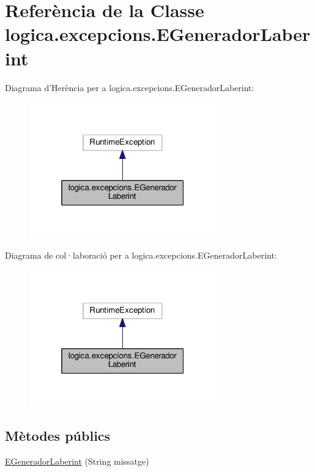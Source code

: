\hypertarget{classlogica_1_1excepcions_1_1_e_generador_laberint}{\section{Referència de la Classe logica.\+excepcions.\+E\+Generador\+Laberint}
\label{classlogica_1_1excepcions_1_1_e_generador_laberint}
}


Diagrama d'Herència per a logica.\+excepcions.\+E\+Generador\+Laberint\+:
\nopagebreak
\begin{figure}[H]
\begin{center}
\leavevmode
\includegraphics[width=229pt]{classlogica_1_1excepcions_1_1_e_generador_laberint__inherit__graph}
\end{center}
\end{figure}


Diagrama de col·laboració per a logica.\+excepcions.\+E\+Generador\+Laberint\+:
\nopagebreak
\begin{figure}[H]
\begin{center}
\leavevmode
\includegraphics[width=229pt]{classlogica_1_1excepcions_1_1_e_generador_laberint__coll__graph}
\end{center}
\end{figure}
\subsection*{Mètodes públics}
\begin{DoxyCompactItemize}
\item 
\hyperlink{classlogica_1_1excepcions_1_1_e_generador_laberint_a011bff23b73bf1d2fae65bdf3216a4c0}{E\+Generador\+Laberint} (String missatge)
\end{DoxyCompactItemize}


